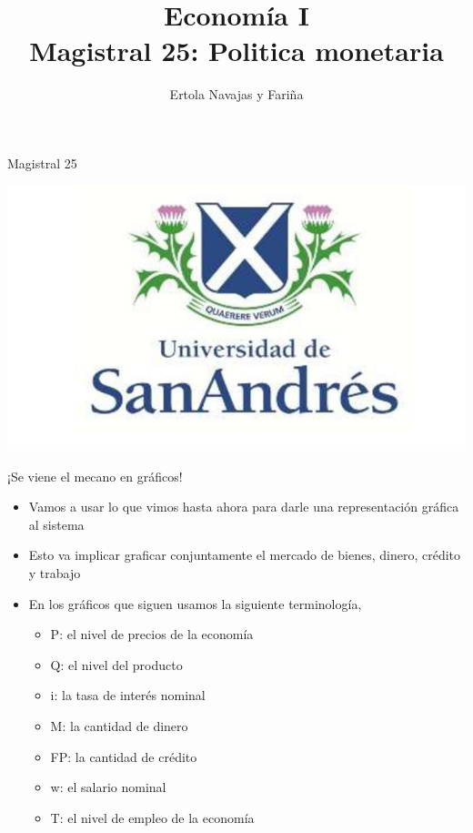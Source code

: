 \documentclass{beamer}
\title[Economía I]{Economía I \vspace{4mm}
\\ Magistral 25: Politica monetaria}
\date{}
\author[Ertola Navajas y Fariña]{Ertola Navajas y Fariña}
\institute[]{Universidad de San Andrés}
\begin{document}
\begin{frame}
\titlepage
\centering
Magistral 25

\includegraphics[scale=0.2]{Slides Principios de Economia/Figures/logoUDESA.jpg} 
\end{frame}


\begin{frame}{¡Se viene el mecano en gráficos!}

\begin{itemize}
    \item Vamos a usar lo que vimos hasta ahora para darle una representación gráfica al sistema 
    \item Esto va implicar graficar conjuntamente el mercado de bienes, dinero, crédito y trabajo
    \item En los gráficos que siguen usamos la siguiente terminología, 
    \begin{itemize}
        \item P: el nivel de precios de la economía
        \item Q: el nivel del producto
        \item i: la tasa de interés nominal
        \item M: la cantidad de dinero
        \item FP: la cantidad de crédito
        \item w: el salario nominal
        \item T: el nivel de empleo de la economía
    \end{itemize}
\end{itemize}

\end{frame}
\end{document}

